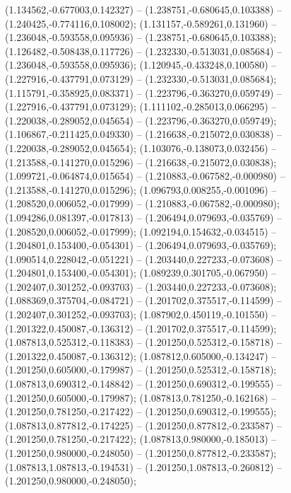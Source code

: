  (1.134562,-0.677003,0.142327) -- (1.238751,-0.680645,0.103388) -- (1.240425,-0.774116,0.108002);
 (1.131157,-0.589261,0.131960) -- (1.236048,-0.593558,0.095936) -- (1.238751,-0.680645,0.103388);
 (1.126482,-0.508438,0.117726) -- (1.232330,-0.513031,0.085684) -- (1.236048,-0.593558,0.095936);
 (1.120945,-0.433248,0.100580) -- (1.227916,-0.437791,0.073129) -- (1.232330,-0.513031,0.085684);
 (1.115791,-0.358925,0.083371) -- (1.223796,-0.363270,0.059749) -- (1.227916,-0.437791,0.073129);
 (1.111102,-0.285013,0.066295) -- (1.220038,-0.289052,0.045654) -- (1.223796,-0.363270,0.059749);
 (1.106867,-0.211425,0.049330) -- (1.216638,-0.215072,0.030838) -- (1.220038,-0.289052,0.045654);
 (1.103076,-0.138073,0.032456) -- (1.213588,-0.141270,0.015296) -- (1.216638,-0.215072,0.030838);
 (1.099721,-0.064874,0.015654) -- (1.210883,-0.067582,-0.000980) -- (1.213588,-0.141270,0.015296);
 (1.096793,0.008255,-0.001096) -- (1.208520,0.006052,-0.017999) -- (1.210883,-0.067582,-0.000980);
 (1.094286,0.081397,-0.017813) -- (1.206494,0.079693,-0.035769) -- (1.208520,0.006052,-0.017999);
 (1.092194,0.154632,-0.034515) -- (1.204801,0.153400,-0.054301) -- (1.206494,0.079693,-0.035769);
 (1.090514,0.228042,-0.051221) -- (1.203440,0.227233,-0.073608) -- (1.204801,0.153400,-0.054301);
 (1.089239,0.301705,-0.067950) -- (1.202407,0.301252,-0.093703) -- (1.203440,0.227233,-0.073608);
 (1.088369,0.375704,-0.084721) -- (1.201702,0.375517,-0.114599) -- (1.202407,0.301252,-0.093703);
 (1.087902,0.450119,-0.101550) -- (1.201322,0.450087,-0.136312) -- (1.201702,0.375517,-0.114599);
 (1.087813,0.525312,-0.118383) -- (1.201250,0.525312,-0.158718) -- (1.201322,0.450087,-0.136312);
 (1.087812,0.605000,-0.134247) -- (1.201250,0.605000,-0.179987) -- (1.201250,0.525312,-0.158718);
 (1.087813,0.690312,-0.148842) -- (1.201250,0.690312,-0.199555) -- (1.201250,0.605000,-0.179987);
 (1.087813,0.781250,-0.162168) -- (1.201250,0.781250,-0.217422) -- (1.201250,0.690312,-0.199555);
 (1.087813,0.877812,-0.174225) -- (1.201250,0.877812,-0.233587) -- (1.201250,0.781250,-0.217422);
 (1.087813,0.980000,-0.185013) -- (1.201250,0.980000,-0.248050) -- (1.201250,0.877812,-0.233587);
 (1.087813,1.087813,-0.194531) -- (1.201250,1.087813,-0.260812) -- (1.201250,0.980000,-0.248050);
